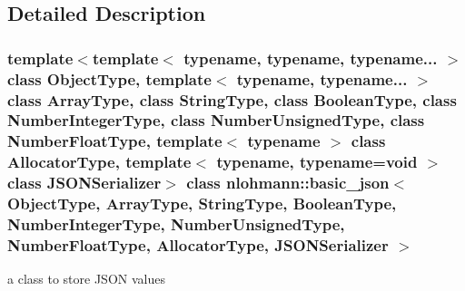 \subsection{Detailed Description}
\subsubsection*{template$<$template$<$ typename, typename, typename... $>$ class Object\+Type, template$<$ typename, typename... $>$ class Array\+Type, class String\+Type, class Boolean\+Type, class Number\+Integer\+Type, class Number\+Unsigned\+Type, class Number\+Float\+Type, template$<$ typename $>$ class Allocator\+Type, template$<$ typename, typename=void $>$ class J\+S\+O\+N\+Serializer$>$\newline
class nlohmann\+::basic\+\_\+json$<$ Object\+Type, Array\+Type, String\+Type, Boolean\+Type, Number\+Integer\+Type, Number\+Unsigned\+Type, Number\+Float\+Type, Allocator\+Type, J\+S\+O\+N\+Serializer $>$}

a class to store J\+S\+ON values 


